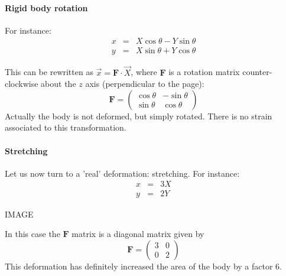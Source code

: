 \paragraph{Rigid body rotation} For instance:
\begin{eqnarray}
x &=& X \cos \theta - Y \sin \theta \\ 
y &=& X \sin \theta + Y \cos \theta 
\end{eqnarray}


\begin{center}
\end{center}



This can be rewritten as $\vec{x}={\bm F}\cdot \vec{X}$, where 
${\bm F}$ is a rotation matrix counter-clockwise about the $z$ axis (perpendicular
to the page):
\[
{\bm F} = 
\left(
\begin{array}{cc}
\cos\theta & -\sin\theta \\
\sin\theta & \cos\theta 
\end{array}
\right)
\]
Actually the body is not deformed, but simply rotated. There is no strain associated to this 
transformation. 


\paragraph{Stretching} Let us now turn to a 'real' deformation: stretching. 
For instance:
\begin{eqnarray}
x &=& 3X   \\
y &=& 2Y 
\end{eqnarray}

IMAGE

In this case the ${\bm F}$ matrix is a diagonal matrix given by 
\[
{\bm F} = 
\left(
\begin{array}{cc}
3 & 0 \\
0 & 2
\end{array}
\right)
\]
This deformation has definitely increased the area of the body by a factor 6.


